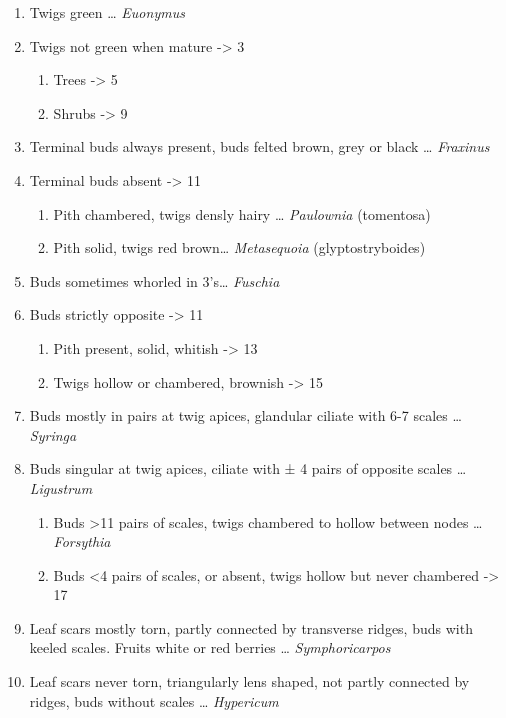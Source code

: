 \documentclass[openany]{book}
\providecommand{\tightlist}{%
  \setlength{\itemsep}{0pt}\setlength{\parskip}{0pt}}
\begin{document}
\begin{enumerate}
\def\labelenumi{\arabic{enumi}.}
\tightlist
\item
  Twigs green \ldots{} \emph{Euonymus}
\item
  Twigs not green when mature -\textgreater{} 3

  \begin{enumerate}
  \def\labelenumii{\arabic{enumii}.}
  \setcounter{enumii}{2}
  \tightlist
  \item
    Trees -\textgreater{} 5
  \item
    Shrubs -\textgreater{} 9
  \end{enumerate}
\item
  Terminal buds always present, buds felted brown, grey or black
  \ldots{} \emph{Fraxinus}
\item
  Terminal buds absent -\textgreater{} 11

  \begin{enumerate}
  \def\labelenumii{\arabic{enumii}.}
  \setcounter{enumii}{6}
  \tightlist
  \item
    Pith chambered, twigs densly hairy \ldots{} \emph{Paulownia}
    (tomentosa)
  \item
    Pith solid, twigs red brown\ldots{} \emph{Metasequoia}
    (glyptostryboides)
  \end{enumerate}
\item
  Buds sometimes whorled in 3's\ldots{} \emph{Fuschia}
\item
  Buds strictly opposite -\textgreater{} 11

  \begin{enumerate}
  \def\labelenumii{\arabic{enumii}.}
  \setcounter{enumii}{10}
  \tightlist
  \item
    Pith present, solid, whitish -\textgreater{} 13
  \item
    Twigs hollow or chambered, brownish -\textgreater{} 15
  \end{enumerate}
\item
  Buds mostly in pairs at twig apices, glandular ciliate with 6-7 scales
  \ldots{} \emph{Syringa}
\item
  Buds singular at twig apices, ciliate with ± 4 pairs of opposite
  scales \ldots{} \emph{Ligustrum}

  \begin{enumerate}
  \def\labelenumii{\arabic{enumii}.}
  \setcounter{enumii}{14}
  \tightlist
  \item
    Buds \textgreater{}11 pairs of scales, twigs chambered to hollow
    between nodes \ldots{} \emph{Forsythia}
  \item
    Buds \textless{}4 pairs of scales, or absent, twigs hollow but never
    chambered -\textgreater{} 17
  \end{enumerate}
\item
  Leaf scars mostly torn, partly connected by transverse ridges, buds
  with keeled scales. Fruits white or red berries \ldots{}
  \emph{Symphoricarpos}
\item
  Leaf scars never torn, triangularly lens shaped, not partly connected
  by ridges, buds without scales \ldots{} \emph{Hypericum}
\end{enumerate}
\end{document}
